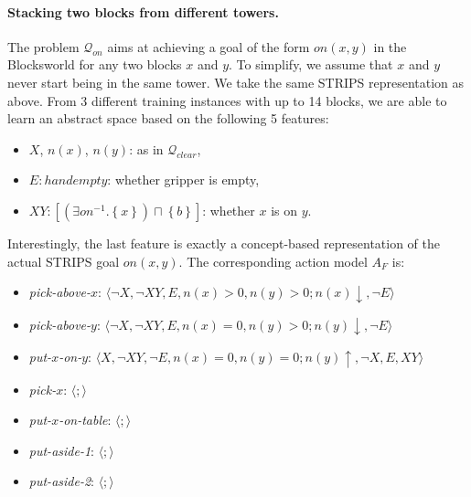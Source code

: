 \documentclass[letterpaper]{article} %
\newcommand{\tuple}[1]{\ensuremath{\langle #1 \rangle}}
\newcommand{\set}[1]{\ensuremath{\left\{#1 \right\}}}
\newcommand{\Q}{\mathcal{Q}}
\begin{document}
% 

% 

\paragraph{Stacking two blocks from different towers.}
The problem $\Q_{on}$ aims at achieving a goal of the form $on(x,y)$
in the Blocksworld for any two blocks $x$ and $y$.
To simplify, we assume that $x$ and $y$ never start being in the same tower.
We take the same STRIPS representation as above. From 3 different training instances with up to 14
blocks, we are able to learn an abstract space based on the following 5 features:

\begin{itemize}
\item $X$, $n(x)$, $n(y)$: as in $\Q_{clear}$,
\item $E: handempty$: whether gripper is empty,
\item $XY: [(\exists on^{-1} . \set{x})\sqcap \set{b}]$: whether $x$ is on $y$.
\end{itemize}

\noindent Interestingly, the last feature is exactly a concept-based representation of the actual STRIPS goal $on(x,y)$.
The corresponding action model $A_F$ is:

\begin{itemize}
\item \emph{pick-above-$x$}:  \tuple{\neg X, \neg XY, E, n(x) > 0, n(y)>0; n(x) \downarrow, \neg E  }
\item \emph{pick-above-$y$}:  \tuple{\neg X, \neg XY, E, n(x) = 0, n(y)>0; n(y) \downarrow, \neg E  }
\item \emph{put-$x$-on-$y$}:  \tuple{X, \neg XY, \neg E, n(x)=0, n(y)=0 ; n(y) \uparrow, \neg X, E, XY}
\item \emph{pick-$x$}:  \tuple{;}
\item \emph{put-$x$-on-table}:  \tuple{;}
\item \emph{put-aside-1}:  \tuple{;}
\item \emph{put-aside-2}:  \tuple{;}

\end{itemize}
\end{document}
